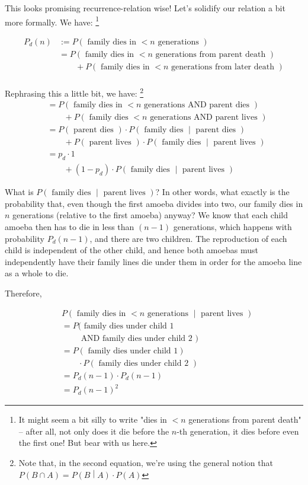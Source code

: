 This looks promising recurrence-relation wise! Let's solidify our relation a bit more formally. We have: \footnote{It might seem a bit silly to write "dies in $<n$ generations from parent death" -- after all, not only does it die before the $n$-th generation, it dies before even the first one! But bear with us here.}

\begin{align*}
P_d(n) &:= P(\text{ family dies in $< n$ generations }) \\
&= P(\text{ family dies in $< n$ generations from parent death }) \\
&\qquad + P(\text{ family dies in $< n$ generations from later death }) \\ %
\end{align*}


Rephrasing this a little bit, we have: \footnote{Note that, in the second equation, we're using the general notion that $P(B \cap A) = P\left(B \middle| A\right) \cdot P(A)$}
\begin{align*}
&= P(\text{ family dies in $< n$ generations AND parent dies }) \\
&\qquad + P(\text{ family dies $< n$ generations AND parent lives }) \\
&= P(\text{ parent dies }) \cdot P\left(\text{ family dies } \middle| \text{ parent dies }\right) \\
&\qquad + P(\text{ parent lives }) \cdot P\left(\text{ family dies } \middle| \text{ parent lives }\right) \\
&= p_d \cdot 1 \\
&\qquad + (1 - p_d) \cdot P\left(\text{ family dies } \middle| \text{ parent lives }\right)
\end{align*}

What is $P\left(\text{ family dies } \middle| \text{ parent lives }\right)$? In other words, what exactly is the probability that, even though the first amoeba divides into two, our family dies in $n$ generations (relative to the first amoeba) anyway? We know that each child amoeba then has to die in less than $(n-1)$ generations, which happens with probability $P_d(n-1)$, and there are two children. The reproduction of each child is independent of the other child, and hence both amoebas must independently have their family lines die under them in order for the amoeba line as a whole to die.

Therefore, 

\begin{align*}
&P\left(\text{ family dies in $<n$ generations } \middle| \text{ parent lives }\right) \\
&= P(\text{ family dies under child 1} \\
&\qquad\text{ AND family dies under child 2 }) \\
&= P\left(\text{ family dies under child 1} \right) \\ 
&\qquad\cdot P\left(\text{ family dies under child 2 } \right) \\
&= P_d(n-1) \cdot P_d(n-1) \\
&= P_d(n-1)^2
\end{align*}

